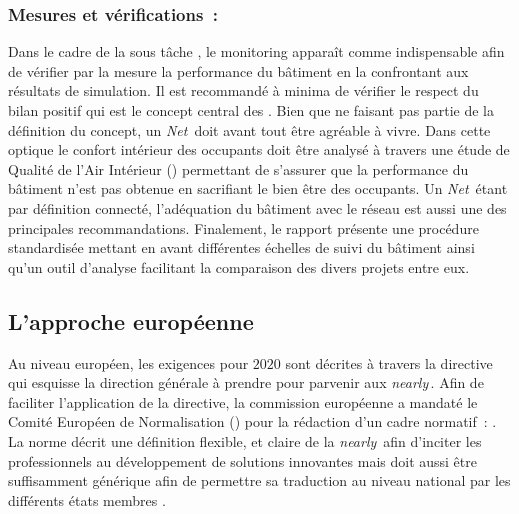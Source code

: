 \subsubsection{Mesures et vérifications~:} %
\label{ssub:mesures_et_verifications}
Dans le cadre de la sous tâche  \parencite{Noris2013}, le monitoring apparaît comme indispensable
afin de vérifier par la mesure la performance du bâtiment en la confrontant aux
résultats de simulation. Il est recommandé à minima de vérifier le respect du bilan
positif qui est le concept central des . Bien que ne faisant pas partie de
la définition du concept, un \textit{Net}\, doit avant tout être agréable à vivre. Dans cette
optique le confort intérieur des occupants doit être analysé à travers une étude de
Qualité de l’Air Intérieur () permettant de s’assurer que la performance du bâtiment n’est pas
obtenue en sacrifiant le bien être des occupants. Un \textit{Net}\, étant par définition connecté,
l’adéquation du bâtiment avec le réseau est aussi une des principales recommandations.
Finalement, le rapport présente une procédure standardisée mettant en avant différentes échelles
de suivi du bâtiment ainsi qu’un outil d’analyse facilitant la comparaison des divers projets entre eux.


\subsection{L’approche européenne} %
\label{ssub:l_approche_europeenne}
Au niveau européen, les exigences pour $2020$ sont décrites à travers la directive
 \parencite{EPBD2010} qui esquisse la direction générale à prendre pour
parvenir aux \textit{nearly}\,. Afin de faciliter l’application de la directive,
la commission européenne a mandaté le Comité Européen de Normalisation () pour la
rédaction d’un cadre normatif~:  \parencite{CEN2013}. La norme décrit
une définition flexible, et claire de la \textit{nearly}\, afin d’inciter les
professionnels au développement de solutions innovantes mais doit aussi être suffisamment
générique afin de permettre sa traduction au niveau national par les différents états
membres \parencite{Zirngibl2014}.


